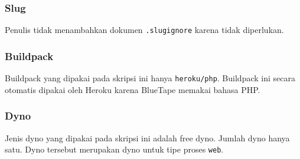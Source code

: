 	\subsubsection{Slug}
		Penulis tidak menambahkan dokumen \texttt{.slugignore} karena tidak diperlukan.
		
	\subsubsection{Buildpack}
		Buildpack yang dipakai pada skripsi ini hanya \texttt{heroku/php}. Buildpack ini secara otomatis dipakai oleh Heroku karena BlueTape memakai bahasa PHP.
		
	\subsubsection{Dyno}
		Jenis dyno yang dipakai pada skripsi ini adalah free dyno. Jumlah dyno hanya satu. Dyno tersebut merupakan dyno untuk tipe proses \texttt{web}.
		
